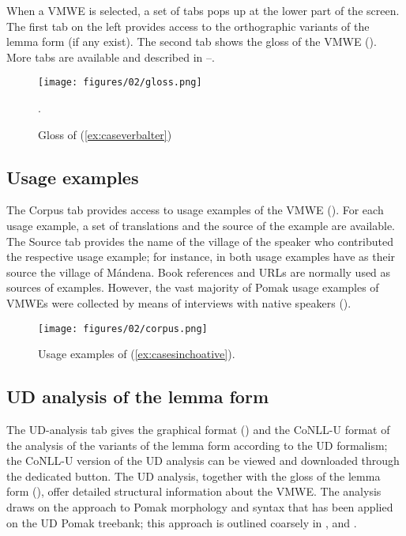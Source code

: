 \documentclass[output=paper,colorlinks,citecolor=brown]{langscibook}
\begin{document}
When a VMWE is selected,  a set of tabs pops up at the lower part of the screen. The first tab on the left provides access to the orthographic variants of the lemma form  (if any exist). The second tab shows the gloss of the VMWE (). More tabs are available and described in –.


\begin{figure}
\texttt{[image: figures/02/gloss.png]}
\caption{Gloss of (\ref{ex:caseverbalter})}. 
\label{fig:chapterhandle:gloss}
\end{figure}

\subsection{Usage examples}
\label{sec:usagesearch}

The Corpus tab provides access to usage examples of the VMWE (). For each usage example, a set of translations and the source of the example are available. The Source tab provides the name of the village of the speaker who contributed the respective usage example; for instance,  in  both usage examples have as their source the village of Mándena. Book references and URLs are normally used as sources of examples. However, the vast majority of Pomak usage examples of VMWEs were collected by means of interviews with native speakers ().

\begin{figure}
\texttt{[image: figures/02/corpus.png]}
\caption{Usage examples of (\ref{ex:casesinchoative}).}
\label{fig:chapterhandle:corpus}
\end{figure}


\subsection{UD analysis of the lemma form}
\label{sec:udsearch}

The  UD-analysis tab gives the graphical format () and the CoNLL-U format of the analysis of the variants of the lemma form according to the UD formalism; the CoNLL-U version of the UD analysis can be viewed and downloaded through the dedicated button. The UD analysis, together with the gloss of the lemma form  (), offer detailed structural information about the VMWE.   The analysis draws on the approach to Pomak morphology and syntax that has been applied on the UD Pomak treebank;  this approach is outlined coarsely in ,  and . 
\end{document}
